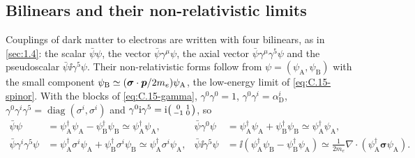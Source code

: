 \subsection{Bilinears and their non-relativistic limits}

Couplings of dark matter to electrons are written with four bilinears, as in \cref{sec:1.4}: the scalar $\bar\psi\psi$, the vector $\bar\psi\gamma^\mu\psi$, the axial vector $\bar\psi\gamma^\mu\gamma^5\psi$ and the pseudoscalar $\bar\psi\ii\gamma^5\psi$. Their non-relativistic forms follow from $\psi = (\psi_{\mathrm{A}}, \psi_{\mathrm{B}})$ with the small component $\psi_{\mathrm{B}} \simeq (\boldsymbol{\sigma}\cdot\bm{p}/2m_e)\psi_{\mathrm{A}}$, the low-energy limit of \cref{eq:C.15-spinor}. With the blocks of \cref{eq:C.15-gamma}, $\gamma^0\gamma^0 = 1$, $\gamma^0\gamma^i = \alpha^i_{\mathrm{D}}$, $\gamma^0\gamma^i\gamma^5 = \operatorname{diag}(\sigma^i, \sigma^i)$ and $\gamma^0\mathrm{i}\gamma^5 = \mathrm{i}\begin{psmallmatrix} 0 & 1\\ -1 & 0 \end{psmallmatrix}$, so
\begin{align}
  \bar\psi\psi &= \psi_{\mathrm{A}}^\dagger\psi_{\mathrm{A}} - \psi_{\mathrm{B}}^\dagger\psi_{\mathrm{B}} \simeq \psi_{\mathrm{A}}^\dagger\psi_{\mathrm{A}}, &
  \bar\psi\gamma^0\psi &= \psi_{\mathrm{A}}^\dagger\psi_{\mathrm{A}} + \psi_{\mathrm{B}}^\dagger\psi_{\mathrm{B}} \simeq \psi_{\mathrm{A}}^\dagger\psi_{\mathrm{A}},
  \nonumber\\
  \bar\psi\gamma^i\gamma^5\psi &= \psi_{\mathrm{A}}^\dagger\sigma^i\psi_{\mathrm{A}} + \psi_{\mathrm{B}}^\dagger\sigma^i\psi_{\mathrm{B}} \simeq \psi_{\mathrm{A}}^\dagger\sigma^i\psi_{\mathrm{A}}, &
  \bar\psi\ii\gamma^5\psi &= \ii(\psi_{\mathrm{A}}^\dagger\psi_{\mathrm{B}} - \psi_{\mathrm{B}}^\dagger\psi_{\mathrm{A}}) \simeq \frac{1}{2m_e}\nabla\cdot(\psi_{\mathrm{A}}^\dagger\boldsymbol{\sigma}\psi_{\mathrm{A}}) .
  \label{eq:C.15-bilinears}
\end{align}
